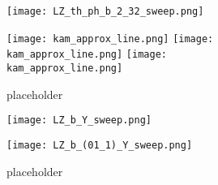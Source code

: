 \begin{figure}[!th]
\centering
\hfill
\begin{subfigure}[h]{0.49\textwidth}
\centering
\texttt{[image: LZ\_th\_ph\_b\_2\_32\_sweep.png]}
\caption{}
\label{subfig:LZpoincaresectionb232}
\end{subfigure}
%
\hfill
\begin{subfigure}[h]{0.49\textwidth}
\centering
\texttt{[image: kam\_approx\_line.png]}
%
\texttt{[image: kam\_approx\_line.png]}
%
\texttt{[image: kam\_approx\_line.png]}
\caption{placeholder}
\end{subfigure}
\hfill
\caption{}
\end{figure}


\begin{figure}[!th]
\centering
\begin{subfigure}[h]{\textwidth}
\centering
\texttt{[image: LZ\_b\_Y\_sweep.png]}
\caption{}
\label{subfig:LZsweepYandb}
\end{subfigure}
%
\begin{subfigure}[h]{\textwidth}
\centering
\texttt{[image: LZ\_b\_(01\_1)\_Y\_sweep.png]}
\caption{placeholder}
\end{subfigure}
\caption{}
\end{figure}